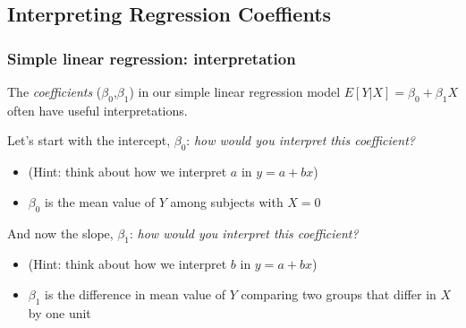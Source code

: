 \documentclass[12pt, 
hyperref={colorlinks=true, linkcolor=blue, urlcolor=cyan}]{beamer}
\begin{document}
\subsection{Interpreting Regression Coeffients}
\begin{frame}
\frametitle{Simple linear regression: interpretation}

The \textit{coefficients} ($\beta_0$,$\beta_1$) in our simple linear regression model $E[Y|X] = \beta_0 + \beta_1 X$ often have useful interpretations.

Let's start with the intercept, $\beta_0$: \textit{how would you interpret this coefficient?} \vspace{-0.3cm}
\begin{itemize}
\item[] (Hint: think about how we interpret $a$ in $y=a+bx$)\pause 
\item[] \color{blue} $\beta_0$ is the mean value of $Y$ among subjects with $X = 0$ \color{black}
\end{itemize}

And now the slope, $\beta_1$: \textit{how would you interpret this coefficient?} \vspace{-0.3cm}
\begin{itemize}
\item[] (Hint: think about how we interpret $b$ in $y=a+bx$) \pause
\item[] \color{blue} $\beta_1$ is the difference in mean value of $Y$ comparing two groups that differ in $X$ by one unit \color{black}
\end{itemize}

\end{frame}
\end{document}
